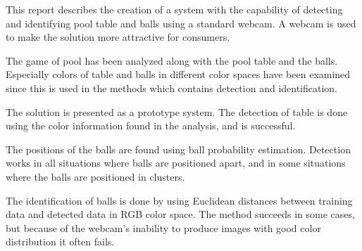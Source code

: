 This report describes the creation of a system with the capability of detecting and identifying pool table and balls using a standard webcam. A webcam is used to make the solution more attractive for consumers.

The game of pool has been analyzed along with the pool table and the balls. Especially colors of table and balls in different color spaces have been examined since this is used in the methods which contains detection and identification.

The solution is presented as a prototype system. The detection of table is done using the color information found in the analysis, and is successful. 

The positions of the balls are found using ball probability estimation. Detection works in all situations where balls are positioned apart, and in some situations where the balls are positioned in clusters.

The identification of balls is done by using Euclidean distances between training data and detected data in RGB color space. The method succeeds in some cases, but because of the webcam's inability to produce images with good color distribution it often fails.